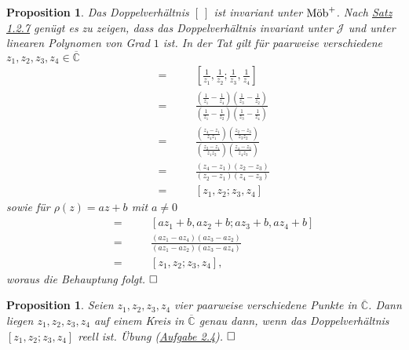 \documentclass[11pt]{book}
\numberwithin{dummy}{section}
\newtheorem{proposition}[theorem]{Proposition}
\theoremstyle{nonumberbreak}
\newenvironment{pr}[1][]{\ifthenelse{\equal{#1}{}}{\proof}{\proof[#1]}\rm}{\endproof}
\newcommand{\CC}{\overline{\mathbb{C}}}
\newcommand{\mob}{\textup{Möb}^+}
\begin{document}
\begin{spacing}{1.4}
\begin{proposition}
Das Doppelverhältnis $[ \ ]$ ist invariant unter $\mob$. 
\begin{pr}
Nach \hyperlink{satzeinszweisieben}{Satz 1.2.7} genügt es zu zeigen, dass das Doppelverhältnis invariant unter $\mathcal{J}$ und unter linearen Polynomen von Grad $1$ ist. In der Tat gilt für paarweise verschiedene $z_1, z_2, z_3, z_4 \in \CC$
\setlength{\abovedisplayskip}{5.5pt}
\setlength{\belowdisplayskip}{5.5pt}
\begin{alignat*}{5}
[\mathcal{J}(z_1),\mathcal{J}(z_2);\mathcal{J}(z_3),\mathcal{J}(z_4),] \quad &=&& \quad \left[ \frac{1}{z_1}, \frac{1}{z_2}; \frac{1}{z_3}, \frac{1}{z_4} \right] \\
&=&& \quad \frac{\left( \frac{1}{z_1} - \frac{1}{z_4} \right)\left( \frac{1}{z_3} - \frac{1}{z_2}\right)}{\left( \frac{1}{z_1} - \frac{1}{z_2}\right)\left( \frac{1}{z_3}- \frac{1}{z_4}\right)} \\
&=&& \quad \frac{ \left( \frac{z_4-z_1}{z_4 z_1}\right) \left( \frac{z_2-z_3}{z_3z_2}\right)}{\left( \frac{z_2-z_1}{z_1z_2}\right)\left( \frac{z_4-z_3}{z_4z_3}\right)} \\
&=&& \quad \frac{(z_4-z_1)(z_2-z_3)}{(z_2-z_1)(z_4-z_3)} \\
&=&& \quad [z_1, z_2; z_3, z_4]
\end{alignat*}
sowie für $\rho(z) = az+b$ mit $a \neq 0$
\setlength{\abovedisplayskip}{5.5pt}
\setlength{\belowdisplayskip}{5.5pt}
\begin{alignat*}{5}
[\rho(z_1), \rho(z_2); \rho(z_3), \rho(z_4)] \quad &=&& \quad [az_1+b, az_2+b; az_3+b, az_4+b] \\
&=&& \quad \frac{(az_1-az_4)(az_3-az_2)}{(az_1-az_2)(az_3-az_4)} \\
&=&& \quad [z_1, z_2; z_3, z_4],
\end{alignat*}
woraus die Behauptung folgt. $\hfill \Box$


\end{pr}

\end{proposition}

\hypertarget{propeinsviervier}{}
\begin{proposition}   %
Seien $z_1,z_2,z_3,z_4$ vier paarweise verschiedene Punkte in $\CC$. Dann liegen {$z_1,z_2,z_3,z_4$ }auf einem Kreis in $\CC$ genau dann, wenn das Doppelverhältnis $[z_1,z_2;z_3,z_4]$ reell ist.
\begin{pr}
Übung (\hyperlink{Azweivier}{Aufgabe 2.4}). $\hfill \Box$
\end{pr}
\end{proposition}





\end{spacing}
\end{document}
